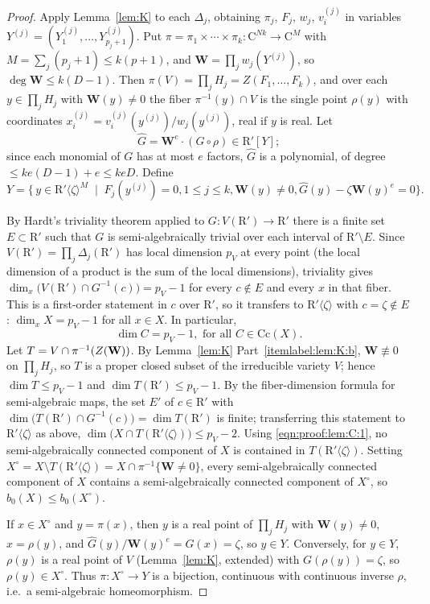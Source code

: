 \documentclass[10pt]{amsart}
\theoremstyle{definition}
\theoremstyle{remark}
\numberwithin{equation}{section}
\newcommand {\R} {\mathrm{R}}
\newcommand {\C}     {\mathrm{C}}
\newcommand {\ZZ} {{\rm Z}}
\newcommand{\Cc}{\mathrm{Cc}}
\newcommand{\Rz}{\R'\langle\zeta\rangle}
\newcommand{\bW}{\mathbf{W}}
\begin{document}
\begin{proof}
Apply Lemma~\ref{lem:K} to each $\Delta_j$, obtaining $\pi_j$, $F_j$, $w_j$, $v^{(j)}_i$ in variables $Y^{(j)}=(Y^{(j)}_1,\dots,Y^{(j)}_{p_j+1})$. Put $\pi=\pi_1\times\cdots\times\pi_k:\C^{Nk}\to\C^M$ with $M=\sum_j(p_j+1)\le k(p+1)$, and $\bW=\prod_j w_j(Y^{(j)})$, so $\deg\bW\le k(D-1)$. Then $\pi(V)=\prod_jH_j=Z(F_1,\dots,F_k)$, and over each $y\in\prod_jH_j$ with $\bW(y)\ne0$ the fiber $\pi^{-1}(y)\cap V$ is the single point $\rho(y)$ with coordinates $x^{(j)}_i=v^{(j)}_i(y^{(j)})/w_j(y^{(j)})$, real if $y$ is real. Let
\[
\widehat G=\bW^{e}\cdot(G\circ\rho)\in\R'[Y];
\]
since each monomial of $G$ has at most $e$ factors, $\widehat G$ is a polynomial, of degree $\leq ke(D-1)+e\le keD$. Define
\[
Y=\bigl\{\,y\in\Rz^{M}\;\mid\; F_j(y^{(j)})=0, 1\leq j\leq k, \bW(y)\neq0, \widehat G(y)-\zeta\bW(y)^{e}=0\bigr\}.
\]

By Hardt's triviality theorem applied to $G:V(\R')\to\R'$ there is a finite set $E\subset\R'$ such that $G$ is semi-algebraically trivial over each interval of $\R'\setminus E$. Since $V(\R')=\prod_j\Delta_j(\R')$ has local dimension $p_V$ at every point (the local dimension of a product is the sum of the local dimensions), triviality gives $\dim_x\bigl(V(\R')\cap G^{-1}(c)\bigr)=p_V-1$ for every $c\notin E$ and every $x$ in that fiber. This is a first-order statement in $c$ over $\R'$, so it transfers to $\Rz$ with $c=\zeta\notin E$: $\dim_xX=p_V-1$ for all $x\in X$. In particular,
\begin{equation}
\label{eqn:proof:lem:C:1}
\dim C=p_V-1, \text{ for all $C\in\Cc(X)$.}
\end{equation}
\medskip
Let $T=V\cap\pi^{-1}(\ZZ(\bW))$. By Lemma~\ref{lem:K} Part~\eqref{itemlabel:lem:K:b}, $\bW\not\equiv 0$ on $\prod_jH_j$, so $T$ is a proper closed subset of the irreducible variety $V$; hence $\dim T\le p_V-1$ and $\dim T(\R')\le p_V-1$. By the fiber-dimension formula for semi-algebraic maps, the set $E'$ of $c\in\R'$ with $\dim\bigl(T(\R')\cap G^{-1}(c)\bigr)=\dim T(\R')$ is finite; transferring 
this statement to \(\R'\langle\zeta\rangle\) as above, $\dim\bigl(X\cap T(\Rz)\bigr)\le p_V-2$. 
Using \eqref{eqn:proof:lem:C:1}, no semi-algebraically connected component of $X$ is contained in $T(\Rz)$. Setting $X^\circ=X\setminus T(\Rz)=X\cap\pi^{-1}\{\bW\ne0\}$, every semi-algebraically connected component of $X$ contains a semi-algebraically connected component of $X^\circ$, so $b_0(X)\le b_0(X^\circ)$.

If $x\in X^\circ$ and $y=\pi(x)$, then $y$ is a real point of $\prod_jH_j$ with $\bW(y)\ne0$, $x=\rho(y)$, and $\widehat G(y)/\bW(y)^e=G(x)=\zeta$, so $y\in Y$. Conversely, for $y\in Y$, $\rho(y)$ is a real point of $V$ (Lemma~\ref{lem:K}, extended) with $G(\rho(y))=\zeta$, so $\rho(y)\in X^\circ$. Thus $\pi:X^\circ\to Y$ is a bijection, continuous with continuous inverse $\rho$, i.e.\ a semi-algebraic homeomorphism.


\end{proof}
\end{document}
